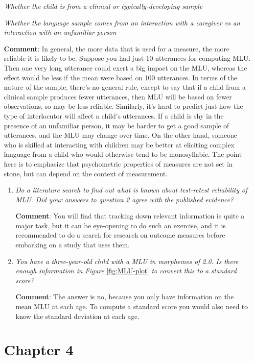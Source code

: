 \documentclass{krantz}
\begin{document}
\emph{Whether the child is from a clinical or typically-developing sample}

\emph{Whether the language sample comes from an interaction with a caregiver vs an interaction with an unfamiliar person}

\textbf{Comment}: In general, the more data that is used for a measure, the more reliable it is likely to be. Suppose you had just 10 utterances for computing MLU. Then one very long utterance could exert a big impact on the MLU, whereas the effect would be less if the mean were based on 100 utterances. In terms of the nature of the sample, there's no general rule, except to say that if a child from a clinical sample produces fewer utterances, then MLU will be based on fewer observations, so may be less reliable. Similarly, it's hard to predict just how the type of interlocutor will affect a child's utterances. If a child is shy in the presence of an unfamiliar person, it may be harder to get a good sample of utterances, and the MLU may change over time. On the other hand, someone who is skilled at interacting with children may be better at eliciting complex language from a child who would otherwise tend to be monosyllabic. The point here is to emphasize that psychometric properties of measures are not set in stone, but can depend on the context of measurement.

\begin{enumerate}
\def\labelenumi{\arabic{enumi}.}
\setcounter{enumi}{2}
\item
  \emph{Do a literature search to find out what is known about test-retest reliability of MLU. Did your answers to question 2 agree with the published evidence?}

  \textbf{Comment}: You will find that tracking down relevant information is quite a major task, but it can be eye-opening to do such an exercise, and it is recommended to do a search for research on outcome measures before embarking on a study that uses them.
\item
  \emph{You have a three-year-old child with a MLU in morphemes of 2.0. Is there enough information in Figure} \ref{fig:MLU-plot} \emph{to convert this to a standard score?}

  \textbf{Comment}: The answer is no, because you only have information on the mean MLU at each age. To compute a standard score you would also need to know the standard deviation at each age.
\end{enumerate}

\hypertarget{chapter-4}{%
\section{Chapter 4}\label{chapter-4}}
\end{document}
